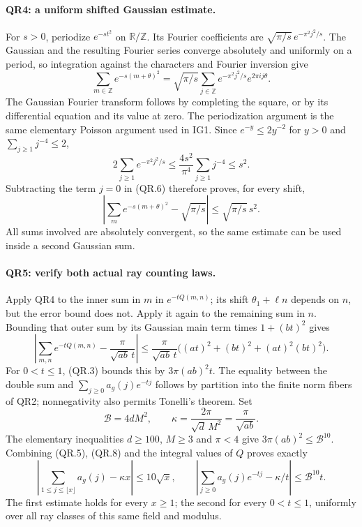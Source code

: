 \paragraph{QR4: a uniform shifted Gaussian estimate.}
For $s>0$, periodize $e^{-s t^2}$ on $\mathbb R/\mathbb Z$.
Its Fourier coefficients are
$\sqrt{\pi/s}\,e^{-\pi^2j^2/s}$. The Gaussian and the resulting
Fourier series converge absolutely and uniformly on a period, so
integration against the characters and Fourier inversion give
\[
 \sum_{m\in\mathbb Z}e^{-s(m+\theta)^2}
 =\sqrt{\pi/s}\sum_{j\in\mathbb Z}
                     e^{-\pi^2j^2/s}e^{2\pi i j\theta}.   \tag{QR.6}
\]
The Gaussian Fourier transform follows by completing the square, or
by its differential equation and its value at zero. The periodization
argument is the same elementary Poisson argument used in IG1.
Since $e^{-y}\le2y^{-2}$ for $y>0$ and
$\sum_{j\ge1}j^{-4}\le2$,
\[
 2\sum_{j\ge1}e^{-\pi^2j^2/s}
 \le\frac{4s^2}{\pi^4}\sum_{j\ge1}j^{-4}\le s^2.
\]
Subtracting the term $j=0$ in (QR.6) therefore proves, for every shift,
\[
 \left|\sum_m e^{-s(m+\theta)^2}-\sqrt{\pi/s}\right|
                  \le\sqrt{\pi/s}\,s^2.                 \tag{QR.7}
\]
All sums involved are absolutely convergent, so the same estimate
can be used inside a second Gaussian sum.

\paragraph{QR5: verify both actual ray counting laws.}
Apply QR4 to the inner sum in $m$ in $e^{-tQ(m,n)}$; its shift
$\theta_1+\ell n$ depends on $n$, but the error bound does not.
Apply it again to the remaining sum in $n$. Bounding that outer
sum by its Gaussian main term times $1+(bt)^2$ gives
\[
 \left|\sum_{m,n}e^{-tQ(m,n)}-\frac{\pi}{\sqrt{ab}\,t}\right|
 \le\frac{\pi}{\sqrt{ab}\,t}
           \big((at)^2+(bt)^2+(at)^2(bt)^2\big).            \tag{QR.8}
\]
For $0<t\le1$, (QR.3) bounds this by $3\pi(ab)^2t$.
The equality between the double sum and
$\sum_{j\ge0}a_g(j)e^{-tj}$ follows by partition into the finite
norm fibers of QR2; nonnegativity also permits Tonelli's theorem.
Set
\[
 \mathcal B=4dM^2,\qquad
 \kappa=\frac{2\pi}{\sqrt d\,M^2}=\frac{\pi}{\sqrt{ab}}.
                                                               \tag{QR.9}
\]
The elementary inequalities $d\ge100$, $M\ge3$ and $\pi<4$
give $3\pi(ab)^2\le\mathcal B^{10}$. Combining (QR.5), (QR.8)
and the integral values of $Q$ proves exactly
\[
 \left|\sum_{1\le j\le\lfloor x\rfloor}a_g(j)-\kappa x\right|
 \le10\sqrt x,\qquad
 \left|\sum_{j\ge0}a_g(j)e^{-tj}-\kappa/t\right|
 \le\mathcal B^{10}t.                                    \tag{QR.10}
\]
The first estimate holds for every $x\ge1$; the second for every
$0<t\le1$, uniformly over all ray classes of this same field and
modulus.

